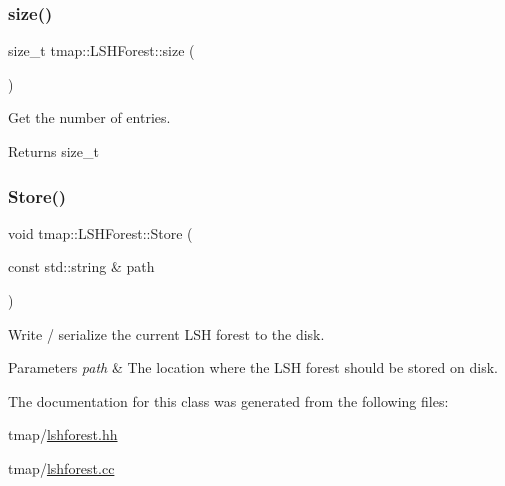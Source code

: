 \subsubsection{\texorpdfstring{size()}{size()}}
{\footnotesize\ttfamily size\+\_\+t tmap\+::\+L\+S\+H\+Forest\+::size (\begin{DoxyParamCaption}{ }\end{DoxyParamCaption})}



Get the number of entries. 

\begin{DoxyReturn}{Returns}
size\+\_\+t 
\end{DoxyReturn}
\mbox{\label{classtmap_1_1LSHForest_a1731bf94cd09e7ebc4a10dd42145dc51}} 
\subsubsection{\texorpdfstring{Store()}{Store()}}
{\footnotesize\ttfamily void tmap\+::\+L\+S\+H\+Forest\+::\+Store (\begin{DoxyParamCaption}\item[{const std\+::string \&}]{path }\end{DoxyParamCaption})}



Write / serialize the current L\+SH forest to the disk. 


\begin{DoxyParams}{Parameters}
{\em path} & The location where the L\+SH forest should be stored on disk. \\
\hline
\end{DoxyParams}


The documentation for this class was generated from the following files\+:\begin{DoxyCompactItemize}
\item 
tmap/\hyperlink{lshforest_8hh}{lshforest.\+hh}\item 
tmap/\hyperlink{lshforest_8cc}{lshforest.\+cc}\end{DoxyCompactItemize}
